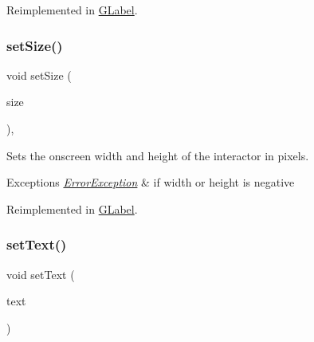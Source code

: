 Reimplemented in \mbox{\hyperlink{classGLabel_ae7e6371aa2311d6f18caf8f7be59704d}{G\+Label}}.

\mbox{\label{classGInteractor_ae2b628228f192c2702c4ce941b2af68f}} 
\subsubsection{\texorpdfstring{set\+Size()}{setSize()}\hspace{0.1cm}{\footnotesize\ttfamily [2/2]}}
{\footnotesize\ttfamily void set\+Size (\begin{DoxyParamCaption}\item[{const \mbox{\hyperlink{classGDimension}{G\+Dimension}} \&}]{size }\end{DoxyParamCaption})\hspace{0.3cm}{\ttfamily [virtual]}, {\ttfamily [inherited]}}



Sets the onscreen width and height of the interactor in pixels. 


\begin{DoxyExceptions}{Exceptions}
{\em \mbox{\hyperlink{classErrorException}{Error\+Exception}}} & if width or height is negative \\
\hline
\end{DoxyExceptions}


Reimplemented in \mbox{\hyperlink{classGLabel_a0fe8cce1a80750f36fa14ee99ca34014}{G\+Label}}.

\mbox{\label{classGBrowserPane_ac1ae51949d41ee9054634be5967d91b8}} 
\subsubsection{\texorpdfstring{set\+Text()}{setText()}}
{\footnotesize\ttfamily void set\+Text (\begin{DoxyParamCaption}\item[{const std\+::string \&}]{text }\end{DoxyParamCaption})\hspace{0.3cm}{\ttfamily [virtual]}}



